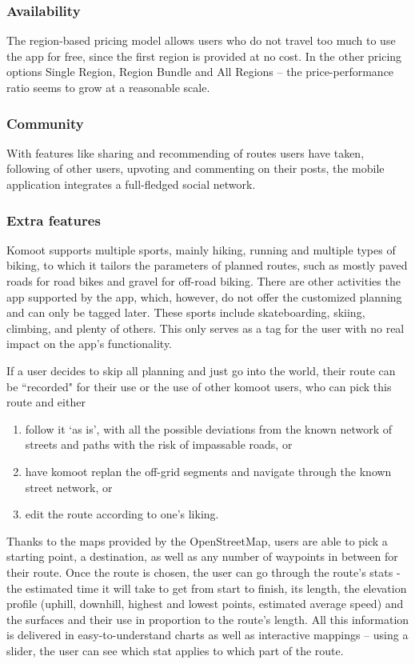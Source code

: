 \subsubsection*{Availability}
The region-based pricing model allows users who do not travel too much to use the app for free,
since the first region is provided at no cost.
In the other pricing options Single Region, Region Bundle and All Regions -- the price-performance ratio seems to grow at a reasonable scale.
\subsubsection*{Community}
With features like sharing and recommending of routes users have taken, following of other users, upvoting and commenting on their posts, the mobile application integrates a full-fledged social network.
\subsubsection*{Extra features}
Komoot supports multiple sports, mainly hiking, running and multiple types of biking, to which it tailors the parameters of planned routes, such as mostly paved roads for road bikes and gravel for off-road biking.
There are other activities the app supported by the app, which, however, do not offer the customized planning and can only be tagged later.
These sports include skateboarding, skiing, climbing, and plenty of others.
This only serves as a tag for the user with no real impact on the app's functionality.

If a user decides to skip all planning and just go into the world, their route can be ``recorded" for their use or the use of other komoot users, who can pick this route and either

\begin{enumerate}[label=(\alph*)]
    \item follow it `as is', with all the possible deviations from the known network of streets and paths with the risk of impassable roads, or
    \item have komoot replan the off-grid segments and navigate through the known street network, or
    \item edit the route according to one's liking.
\end{enumerate}

Thanks to the maps provided by the OpenStreetMap, users are able to pick a starting point, a destination, as well as any number of waypoints in between for their route.
Once the route is chosen, the user can go through the route's stats - the estimated time it will take to get from start to finish, its length, the elevation profile (uphill, downhill, highest and lowest points, estimated average speed) and the surfaces and their use in proportion to the route's length.
All this information is delivered in easy-to-understand charts as well as interactive mappings -- using a slider, the user can see which stat applies to which part of the route.

